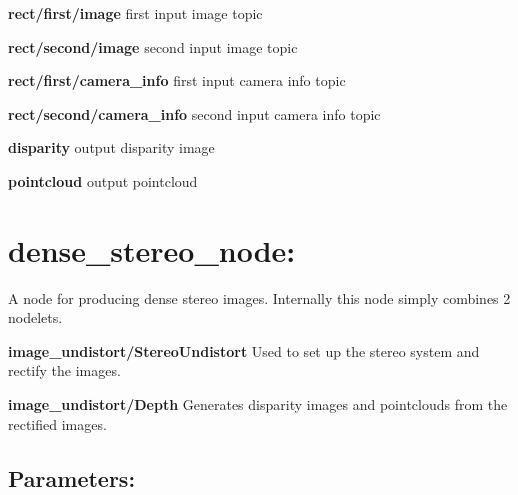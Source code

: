 \begin{DoxyItemize}
\item {\bfseries rect/first/image} first input image topic
\item {\bfseries rect/second/image} second input image topic
\item {\bfseries rect/first/camera\+\_\+info} first input camera info topic
\item {\bfseries rect/second/camera\+\_\+info} second input camera info topic
\item {\bfseries disparity} output disparity image
\item {\bfseries pointcloud} output pointcloud
\end{DoxyItemize}\hypertarget{md_vision_layer_image_undistort_README_autotoc_md109}{}\section{dense\+\_\+stereo\+\_\+node\+:}\label{md_vision_layer_image_undistort_README_autotoc_md109}
A node for producing dense stereo images. Internally this node simply combines 2 nodelets.
\begin{DoxyItemize}
\item {\bfseries image\+\_\+undistort/\+Stereo\+Undistort} Used to set up the stereo system and rectify the images.
\item {\bfseries image\+\_\+undistort/\+Depth} Generates disparity images and pointclouds from the rectified images.
\end{DoxyItemize}\hypertarget{md_vision_layer_image_undistort_README_autotoc_md110}{}\subsection{Parameters\+:}\label{md_vision_layer_image_undistort_README_autotoc_md110}

